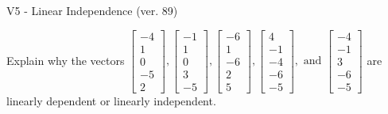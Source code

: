 \begin{exercise}
  \begin{exerciseTitle}V5 - Linear Independence (ver. 89)\end{exerciseTitle}
  \begin{exerciseStatement}
    Explain why the vectors \(\left[\begin{array}{r}
-4 \\
1 \\
0 \\
-5 \\
2
\end{array}\right] , \left[\begin{array}{r}
-1 \\
1 \\
0 \\
3 \\
-5
\end{array}\right] , \left[\begin{array}{r}
-6 \\
1 \\
-6 \\
2 \\
5
\end{array}\right] , \left[\begin{array}{r}
4 \\
-1 \\
-4 \\
-6 \\
-5
\end{array}\right] , \text{ and } \left[\begin{array}{r}
-4 \\
-1 \\
3 \\
-6 \\
-5
\end{array}\right]\) are linearly dependent or linearly independent.	



\end{exerciseStatement}
\end{exercise}
